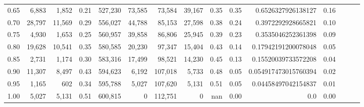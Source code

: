 \begin{tabular}{rrrrrrrrrrrrrrr}
0.65 &   6,883 &   1,852 &  0.21 &  527,230 &   73,585 &   73,584 &   39,167 &  0.35 &  0.35 &    0.6526327926138127 &      0.16 \\
0.70 &  28,797 &  11,569 &  0.29 &  556,027 &   44,788 &   85,153 &   27,598 &  0.38 &  0.24 &    0.3972292928665821 &      0.10 \\
0.75 &   4,930 &   1,653 &  0.25 &  560,957 &   39,858 &   86,806 &   25,945 &  0.39 &  0.23 &    0.3535046252361398 &      0.09 \\
0.80 &  19,628 &  10,541 &  0.35 &  580,585 &   20,230 &   97,347 &   15,404 &  0.43 &  0.14 &   0.17942191200078048 &      0.05 \\
0.85 &   2,731 &   1,174 &  0.30 &  583,316 &   17,499 &   98,521 &   14,230 &  0.45 &  0.13 &   0.15520039733572208 &      0.04 \\
0.90 &  11,307 &   8,497 &  0.43 &  594,623 &    6,192 &  107,018 &    5,733 &  0.48 &  0.05 &  0.054917473015760394 &      0.02 \\
0.95 &   1,165 &     602 &  0.34 &  595,788 &    5,027 &  107,620 &    5,131 &  0.51 &  0.05 &   0.04458497042154837 &      0.01 \\
1.00 &   5,027 &   5,131 &  0.51 &  600,815 &        0 &  112,751 &        0 &   nan &  0.00 &                   0.0 &      0.00 \\
\bottomrule
\end{tabular}
